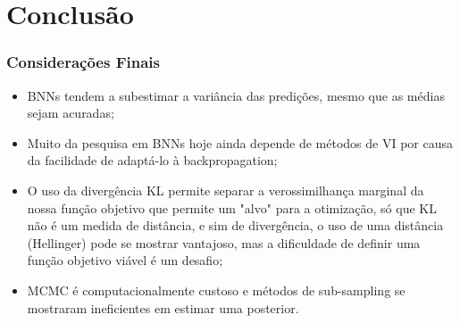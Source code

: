 \documentclass{beamer}
\begin{document}
\section{Conclusão}

\begin{frame}
    \frametitle{Considerações Finais}

    \begin{itemize}
        \item BNNs tendem a subestimar a variância das predições, mesmo que as médias sejam acuradas;
        \item Muito da pesquisa em BNNs hoje ainda depende de métodos de VI por causa da facilidade de adaptá-lo à backpropagation;
        \item O uso da divergência KL permite separar a verossimilhança marginal da nossa função objetivo que permite um "alvo" para a otimização, só que KL não é um medida de distância, e sim de divergência, o uso de uma distância (Hellinger) pode se mostrar vantajoso, mas a dificuldade de definir uma função objetivo viável é um desafio;
        \item MCMC é computacionalmente custoso e métodos de sub-sampling se mostraram ineficientes em estimar uma posterior.
    \end{itemize}

\end{frame}






\end{document}
